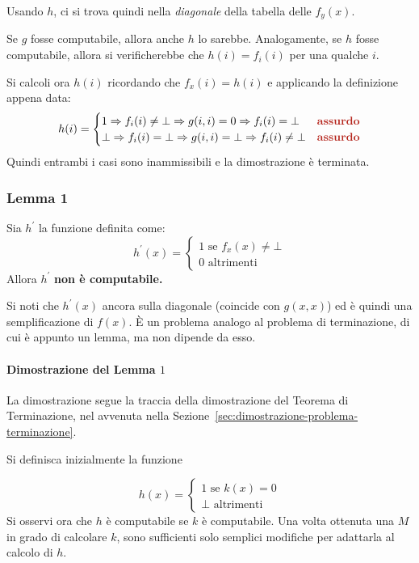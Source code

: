\documentclass[italian, 10pt]{article}
\begin{document}
Usando \(h\), ci si trova quindi nella \textit{diagonale} della tabella delle \(f_y(x)\).

\bigskip
Se \(g\) fosse computabile, allora anche \(h\) lo sarebbe.
Analogamente, se \(h\) fosse computabile, allora si verificherebbe che \(h(i) = f_i(i)\) per una qualche \(i\).

Si calcoli ora \(h(i)\) ricordando che \(f_x(i) = h(i)\) e applicando la definizione appena data:
\[ h(i) =
  \begin{cases}
    1 \Rightarrow f_i(i) \neq \bot \Rightarrow g(i, i) = 0 \Rightarrow f_i(i) = \bot       & \textbf{\color{BrickRed}{assurdo}} \\
    \bot \Rightarrow f_i(i) = \bot \Rightarrow g(i, i) = \bot \Rightarrow f_i(i) \neq \bot & \textbf{\color{BrickRed}{assurdo}}
  \end{cases}
\]
Quindi entrambi i casi sono inammissibili e la dimostrazione è terminata.

\subsubsection{Lemma 1}

Sia \(h^\prime\) la funzione definita come:
\[ h^\prime(x) =
  \begin{cases}
    1 \text{ se } f_x(x) \neq \bot \\
    0 \text{ altrimenti }
  \end{cases}
\]
Allora \(h^\prime\) \textbf{non è computabile.}

Si noti che \(h^\prime(x)\)  ancora sulla diagonale (coincide con \(g(x, x)\)) ed è quindi una semplificazione di \(f(x)\).
È un problema analogo al problema di terminazione, di cui è appunto un lemma, ma non dipende da esso.

\paragraph[Dimostazione del Lemma 1]{Dimostrazione del Lemma \(1\)}

La dimostrazione segue la traccia della dimostrazione del Teorema di Terminazione, nel avvenuta nella Sezione~\ref{sec:dimostrazione-problema-terminazione}.

\bigskip
Si definisca inizialmente la funzione

\[ h(x) =
  \begin{cases}
    1 \text{ se } k(x) = 0 \\
    \bot \text{ altrimenti }
  \end{cases}
\]
Si osservi ora che \(h\) è computabile se \(k\) è computabile.
Una volta ottenuta una \TM \(M\) in grado di calcolare \(k\), sono sufficienti solo semplici modifiche per adattarla al calcolo di \(h\).
\end{document}
